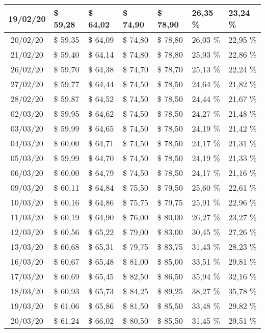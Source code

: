 \begin{center}
\begin{longtable}{|c|p{1.5cm}|p{1.5cm}|p{1.5cm}|p{1.5cm}|p{1.5cm}|p{1.5cm}|}
19/02/20 & \$ 59,28 & \$ 64,02 & \$ 74,90 & \$ 78,90 & 26,35 \% & 23,24 \% \\ \hline
20/02/20 & \$ 59,35 & \$ 64,09 & \$ 74,80 & \$ 78,80 & 26,03 \% & 22,95 \% \\ \hline
21/02/20 & \$ 59,40 & \$ 64,14 & \$ 74,80 & \$ 78,80 & 25,93 \% & 22,86 \% \\ \hline
26/02/20 & \$ 59,70 & \$ 64,38 & \$ 74,70 & \$ 78,70 & 25,13 \% & 22,24 \% \\ \hline
27/02/20 & \$ 59,77 & \$ 64,44 & \$ 74,50 & \$ 78,50 & 24,64 \% & 21,82 \% \\ \hline
28/02/20 & \$ 59,87 & \$ 64,52 & \$ 74,50 & \$ 78,50 & 24,44 \% & 21,67 \% \\ \hline
02/03/20 & \$ 59,95 & \$ 64,62 & \$ 74,50 & \$ 78,50 & 24,27 \% & 21,48 \% \\ \hline
03/03/20 & \$ 59,99 & \$ 64,65 & \$ 74,50 & \$ 78,50 & 24,19 \% & 21,42 \% \\ \hline
04/03/20 & \$ 60,00 & \$ 64,71 & \$ 74,50 & \$ 78,50 & 24,17 \% & 21,31 \% \\ \hline
05/03/20 & \$ 59,99 & \$ 64,70 & \$ 74,50 & \$ 78,50 & 24,19 \% & 21,33 \% \\ \hline
06/03/20 & \$ 60,00 & \$ 64,79 & \$ 74,50 & \$ 78,50 & 24,17 \% & 21,16 \% \\ \hline
09/03/20 & \$ 60,11 & \$ 64,84 & \$ 75,50 & \$ 79,50 & 25,60 \% & 22,61 \% \\ \hline
10/03/20 & \$ 60,16 & \$ 64,86 & \$ 75,75 & \$ 79,75 & 25,91 \% & 22,96 \% \\ \hline
11/03/20 & \$ 60,19 & \$ 64,90 & \$ 76,00 & \$ 80,00 & 26,27 \% & 23,27 \% \\ \hline
12/03/20 & \$ 60,56 & \$ 65,22 & \$ 79,00 & \$ 83,00 & 30,45 \% & 27,26 \% \\ \hline
13/03/20 & \$ 60,68 & \$ 65,31 & \$ 79,75 & \$ 83,75 & 31,43 \% & 28,23 \% \\ \hline
16/03/20 & \$ 60,67 & \$ 65,48 & \$ 81,00 & \$ 85,00 & 33,51 \% & 29,81 \% \\ \hline
17/03/20 & \$ 60,69 & \$ 65,45 & \$ 82,50 & \$ 86,50 & 35,94 \% & 32,16 \% \\ \hline
18/03/20 & \$ 60,93 & \$ 65,73 & \$ 84,25 & \$ 89,25 & 38,27 \% & 35,78 \% \\ \hline
19/03/20 & \$ 61,06 & \$ 65,86 & \$ 81,50 & \$ 85,50 & 33,48 \% & 29,82 \% \\ \hline
20/03/20 & \$ 61,24 & \$ 66,02 & \$ 80,50 & \$ 85,50 & 31,45 \% & 29,51 \% \\ \hline

\end{longtable}
\end{center}
